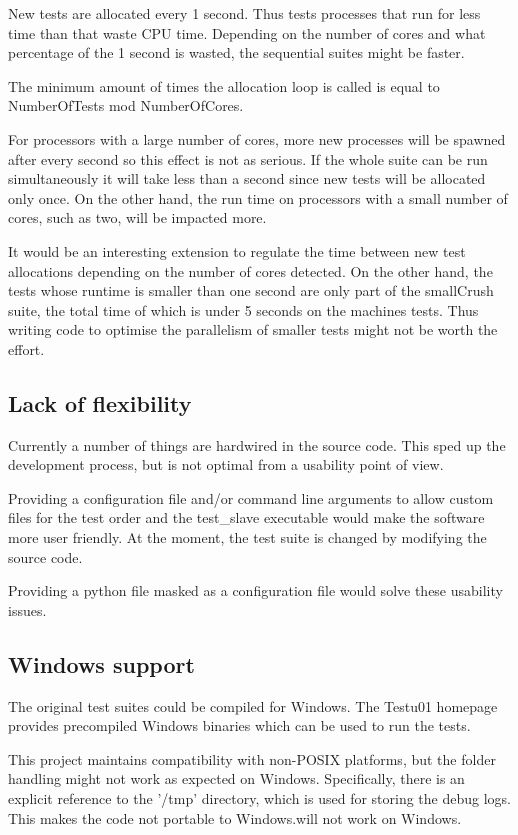 New tests are allocated every 1 second. Thus tests processes that run for less time than that waste CPU time. Depending on the number of cores and what percentage of the 1 second is wasted, the sequential suites might be faster.

The minimum amount of times the allocation loop is called is equal to NumberOfTests mod NumberOfCores.

For processors with a large number of cores, more new processes will be spawned after every second so this effect is not as serious. If the whole suite can be run simultaneously it will take less than a second since new tests will be allocated only once. On the other hand, the run time on processors with a small number of cores, such as two, will be impacted more.

It would be an interesting extension to regulate the time between new test allocations depending on the number of cores detected. On the other hand, the tests whose runtime is smaller than one second are only part of the smallCrush suite, the total time of which is under 5 seconds on the machines tests. Thus writing code to optimise the parallelism of smaller tests might not be worth the effort.

\subsection{Lack of flexibility}
Currently a number of things are hardwired in the source code. This sped up the development process, but is not optimal from a usability point of view.

Providing a configuration file and/or command line arguments to allow custom files for the test order and the test\_slave executable would make the software more user friendly. At the moment, the test suite is changed by modifying the source code.

Providing a python file masked as a configuration file would solve these usability issues.


\subsection{Windows support}
The original test suites could be compiled for Windows. The Testu01 homepage provides precompiled Windows binaries which can be used to run the tests.

This project maintains compatibility with non-POSIX platforms, but the folder handling might not work as expected on Windows. Specifically, there is an explicit reference to the '/tmp' directory, which is used for storing the debug logs. This makes the code not portable to Windows.will not work on Windows.

